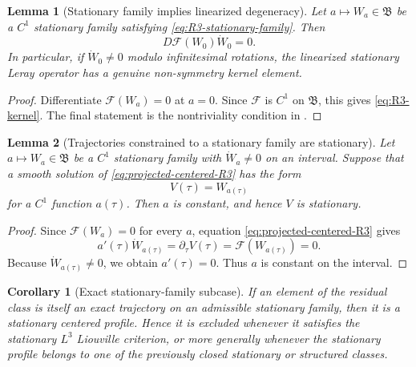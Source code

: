 \documentclass[11pt]{amsart}
\numberwithin{equation}{section}
\theoremstyle{plain}
\newtheorem{lemma}[lemma]{Lemma}
\newtheorem{corollary}[corollary]{Corollary}
\theoremstyle{definition}
\theoremstyle{remark}
\begin{document}
\begin{lemma}[Stationary family implies linearized degeneracy]
\label{lem:R3-family-kernel}
Let \(a\mapsto W_a\in\mathfrak B\) be a \(C^1\) stationary family satisfying
\eqref{eq:R3-stationary-family}.  Then
\begin{equation}\label{eq:R3-kernel}
   D\mathcal F(W_0)\dot W_0=0 .
\end{equation}
In particular, if \(\dot W_0\ne0\) modulo infinitesimal rotations, the
linearized stationary Leray operator has a genuine non-symmetry kernel element.
\end{lemma}

\begin{proof}
Differentiate \(\mathcal F(W_a)=0\) at \(a=0\).  Since \(\mathcal F\) is \(C^1\)
on \(\mathfrak B\), this gives \eqref{eq:R3-kernel}.  The final statement is
the nontriviality condition in .
\end{proof}

\begin{lemma}[Trajectories constrained to a stationary family are stationary]
\label{lem:R3-family-constrained-stationary}
Let \(a\mapsto W_a\in\mathfrak B\) be a \(C^1\) stationary family with
\(\dot W_a\ne0\) on an interval.  Suppose that a smooth solution of
\eqref{eq:projected-centered-R3} has the form
\begin{equation}\label{eq:R3-family-trajectory}
   V(\tau)=W_{a(\tau)}
\end{equation}
for a \(C^1\) function \(a(\tau)\).  Then \(a\) is constant, and hence
\(V\) is stationary.
\end{lemma}

\begin{proof}
Since \(\mathcal F(W_a)=0\) for every \(a\), equation
\eqref{eq:projected-centered-R3} gives
\[
   a'(\tau)\dot W_{a(\tau)}=\partial_\tau V(\tau)=\mathcal F(W_{a(\tau)})=0 .
\]
Because \(\dot W_{a(\tau)}\ne0\), we obtain \(a'(\tau)=0\).  Thus \(a\) is
constant on the interval.
\end{proof}

\begin{corollary}[Exact stationary-family subcase]
\label{cor:R3-exact-family-subcase}
If an element of the residual class is itself an exact trajectory on an
admissible stationary family, then it is a stationary centered profile.  Hence
it is excluded whenever it satisfies the stationary \(L^3\) Liouville
criterion, or more generally whenever the stationary profile belongs to one of
the previously closed stationary or structured classes.
\end{corollary}
\end{document}
